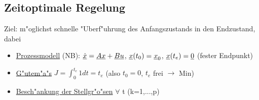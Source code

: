 \documentclass[openany,a4paper,11pt]{book}
\begin{document}

\subsection{Zeitoptimale Regelung}
Ziel: m"oglichst schnelle "Uberf"uhrung des Anfangszustands in den Endzustand, dabei\begin{itemize}
    \item \uline{Prozessmodell} (NB): \quad $\uline{\dot{x}}=\uline{Ax}+\uline{Bu}$, $\uline{x}(t_0)=\uline{x}_0$, $\uline{x}(t_e)=\uline{0}$ (fester Endpunkt)
    \item \uline{G"utem"a"s} \quad $J=\int_0^{t_e}1dt=t_e$ (also $t_0=0$, $t_e$ frei $\rightarrow$ Min)
    \item \uline{Besch"ankung der Stellgr"o"sen} \quad $\forall$ t  (k=1,...,p)
\end{itemize}
\end{document}
